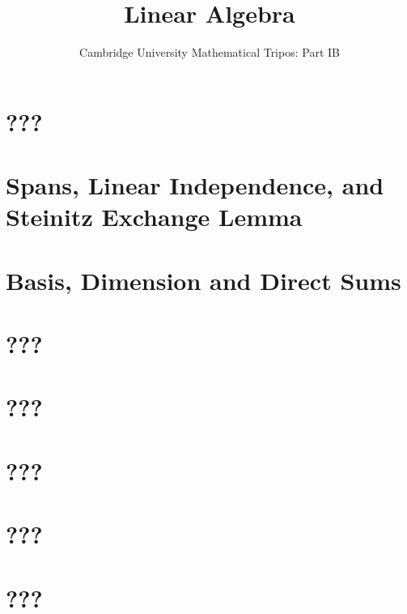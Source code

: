 \documentclass{article}
\title{Linear Algebra}
\author{Cambridge University Mathematical Tripos: Part IB}
\begin{document}
\maketitle

\tableofcontentsnewpage{}

\section{???}

\section{Spans, Linear Independence, and Steinitz Exchange Lemma}

\section{Basis, Dimension and Direct Sums}

\section{???}

\section{???}

\section{???}

\section{???}

\section{???}

\end{document}
